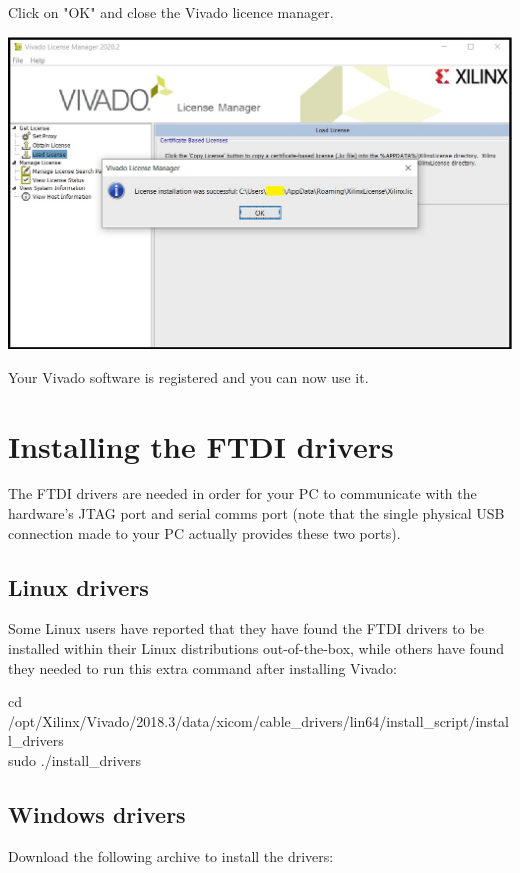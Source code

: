 \begin{minipage}{\linewidth}
  Click on "OK" and close the Vivado licence manager.
  \\
  \begin{center}
    \includegraphics[width=0.7\linewidth]{images/VivadoInstimg032.jpg}
  \end{center}

  Your Vivado software is registered and you can now use it.
\end{minipage}

\section{Installing the FTDI drivers}

The FTDI drivers are needed in order for your PC to communicate with the hardware's JTAG port and serial comms port (note that the single physical USB connection made to your PC actually provides these two ports).

\subsection{Linux drivers}

Some Linux users have reported that they have found the FTDI drivers to be installed within their Linux distributions out-of-the-box, while others have found they needed to run this extra command after installing Vivado:

cd /opt/Xilinx/Vivado/2018.3/data/xicom/cable\_drivers/lin64/install\_script/install\_drivers \\
sudo ./install\_drivers

\subsection{Windows drivers}

Download the following archive to install the drivers:

